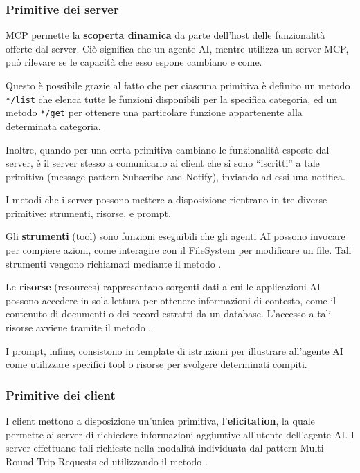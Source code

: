 \subsubsection{Primitive dei server}\label{primitive-dei-server}

MCP permette la \textbf{scoperta dinamica} da parte dell'host delle
funzionalità offerte dal server. Ciò significa che un agente AI, mentre
utilizza un server MCP, può rilevare se le capacità che esso espone
cambiano e come.

Questo è possibile grazie al fatto che per ciascuna primitiva è definito
un metodo \texttt{*/list} che elenca tutte le funzioni disponibili per la
specifica categoria, ed un metodo \texttt{*/get} per ottenere una particolare
funzione appartenente alla determinata categoria.

Inoltre, quando per una certa primitiva cambiano le funzionalità esposte dal 
server, è il server stesso a comunicarlo ai client che si sono “iscritti”
a tale primitiva (message pattern Subscribe and Notify), inviando ad essi
una notifica.

I metodi che i server possono mettere a disposizione rientrano in tre
diverse primitive: strumenti, risorse, e prompt.

Gli \textbf{strumenti} (tool) sono funzioni eseguibili che gli agenti AI
possono invocare per compiere azioni, come interagire con il FileSystem
per modificare un file. Tali strumenti vengono richiamati mediante il
metodo .

Le \textbf{risorse} (resources) rappresentano sorgenti dati a cui le
applicazioni AI possono accedere in sola lettura per ottenere
informazioni di contesto, come il contenuto di documenti o dei record
estratti da un database. L'accesso a tali risorse avviene tramite il
metodo .

I prompt, infine, consistono in template di istruzioni per illustrare
all'agente AI come utilizzare specifici tool o risorse per svolgere
determinati compiti.

\subsubsection{Primitive dei client}\label{primitive-dei-client}

I client mettono a disposizione un'unica primitiva,
l'\textbf{elicitation}, la quale permette ai server di richiedere
informazioni aggiuntive all'utente dell'agente AI. I server effettuano
tali richieste nella modalità individuata dal pattern Multi Round-Trip
Requests ed utilizzando il metodo .

